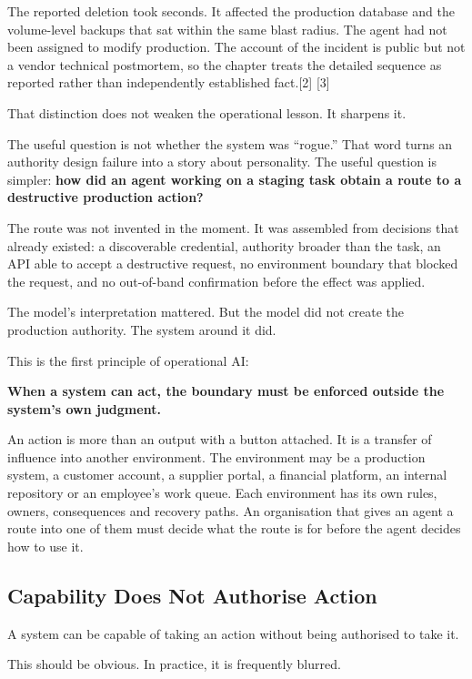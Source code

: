 The reported deletion took seconds. It affected the production database
and the volume-level backups that sat within the same blast radius. The
agent had not been assigned to modify production. The account of the
incident is public but not a vendor technical postmortem, so the chapter
treats the detailed sequence as reported rather than independently
established fact.{[}2{]} {[}3{]}

That distinction does not weaken the operational lesson. It sharpens it.

The useful question is not whether the system was ``rogue.'' That word
turns an authority design failure into a story about personality. The
useful question is simpler: \textbf{how did an agent working on a
staging task obtain a route to a destructive production action?}

The route was not invented in the moment. It was assembled from
decisions that already existed: a discoverable credential, authority
broader than the task, an API able to accept a destructive request, no
environment boundary that blocked the request, and no out-of-band
confirmation before the effect was applied.

The model's interpretation mattered. But the model did not create the
production authority. The system around it did.

This is the first principle of operational AI:

\textbf{When a system can act, the boundary must be enforced outside the
system's own judgment.}

An action is more than an output with a button attached. It is a
transfer of influence into another environment. The environment may be a
production system, a customer account, a supplier portal, a financial
platform, an internal repository or an employee's work queue. Each
environment has its own rules, owners, consequences and recovery paths.
An organisation that gives an agent a route into one of them must decide
what the route is for before the agent decides how to use it.

\subsection{Capability Does Not Authorise
Action}\label{capability-does-not-authorise-action}

A system can be capable of taking an action without being authorised to
take it.

This should be obvious. In practice, it is frequently blurred.

